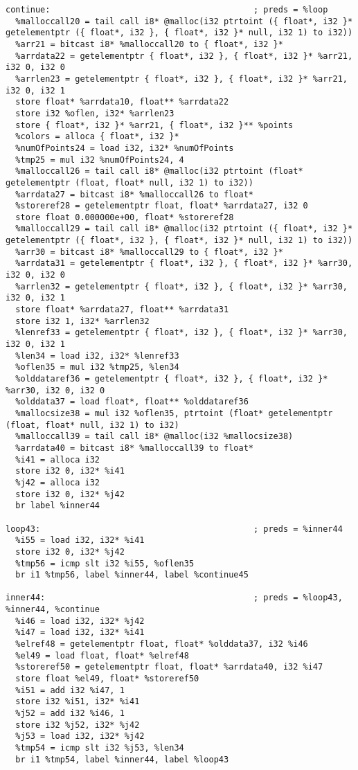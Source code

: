 \documentclass[main.tex]{subfiles}
\begin{document}
{\begin{lstlisting}
continue:                                         ; preds = %loop
  %malloccall20 = tail call i8* @malloc(i32 ptrtoint ({ float*, i32 }* getelementptr ({ float*, i32 }, { float*, i32 }* null, i32 1) to i32))
  %arr21 = bitcast i8* %malloccall20 to { float*, i32 }*
  %arrdata22 = getelementptr { float*, i32 }, { float*, i32 }* %arr21, i32 0, i32 0
  %arrlen23 = getelementptr { float*, i32 }, { float*, i32 }* %arr21, i32 0, i32 1
  store float* %arrdata10, float** %arrdata22
  store i32 %oflen, i32* %arrlen23
  store { float*, i32 }* %arr21, { float*, i32 }** %points
  %colors = alloca { float*, i32 }*
  %numOfPoints24 = load i32, i32* %numOfPoints
  %tmp25 = mul i32 %numOfPoints24, 4
  %malloccall26 = tail call i8* @malloc(i32 ptrtoint (float* getelementptr (float, float* null, i32 1) to i32))
  %arrdata27 = bitcast i8* %malloccall26 to float*
  %storeref28 = getelementptr float, float* %arrdata27, i32 0
  store float 0.000000e+00, float* %storeref28
  %malloccall29 = tail call i8* @malloc(i32 ptrtoint ({ float*, i32 }* getelementptr ({ float*, i32 }, { float*, i32 }* null, i32 1) to i32))
  %arr30 = bitcast i8* %malloccall29 to { float*, i32 }*
  %arrdata31 = getelementptr { float*, i32 }, { float*, i32 }* %arr30, i32 0, i32 0
  %arrlen32 = getelementptr { float*, i32 }, { float*, i32 }* %arr30, i32 0, i32 1
  store float* %arrdata27, float** %arrdata31
  store i32 1, i32* %arrlen32
  %lenref33 = getelementptr { float*, i32 }, { float*, i32 }* %arr30, i32 0, i32 1
  %len34 = load i32, i32* %lenref33
  %oflen35 = mul i32 %tmp25, %len34
  %olddataref36 = getelementptr { float*, i32 }, { float*, i32 }* %arr30, i32 0, i32 0
  %olddata37 = load float*, float** %olddataref36
  %mallocsize38 = mul i32 %oflen35, ptrtoint (float* getelementptr (float, float* null, i32 1) to i32)
  %malloccall39 = tail call i8* @malloc(i32 %mallocsize38)
  %arrdata40 = bitcast i8* %malloccall39 to float*
  %i41 = alloca i32
  store i32 0, i32* %i41
  %j42 = alloca i32
  store i32 0, i32* %j42
  br label %inner44

loop43:                                           ; preds = %inner44
  %i55 = load i32, i32* %i41
  store i32 0, i32* %j42
  %tmp56 = icmp slt i32 %i55, %oflen35
  br i1 %tmp56, label %inner44, label %continue45

inner44:                                          ; preds = %loop43, %inner44, %continue
  %i46 = load i32, i32* %j42
  %i47 = load i32, i32* %i41
  %elref48 = getelementptr float, float* %olddata37, i32 %i46
  %el49 = load float, float* %elref48
  %storeref50 = getelementptr float, float* %arrdata40, i32 %i47
  store float %el49, float* %storeref50
  %i51 = add i32 %i47, 1
  store i32 %i51, i32* %i41
  %j52 = add i32 %i46, 1
  store i32 %j52, i32* %j42
  %j53 = load i32, i32* %j42
  %tmp54 = icmp slt i32 %j53, %len34
  br i1 %tmp54, label %inner44, label %loop43


\end{lstlisting}}
\end{document}
